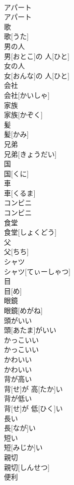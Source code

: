 \documentclass[8pt]{extreport}
\begin{document}
\begin{CJK}{UTF8}{min}
\\	アパート	
\\	アパート
\\	歌	
\\	歌[うた]
\\	男の人	
\\	男[おとこ]の 人[ひと]
\\	女の人	
\\	女[おんな]の 人[ひと]
\\	会社	
\\	会社[かいしゃ]
\\	家族	
\\	家族[かぞく]
\\	髪	
\\	髪[かみ]
\\	兄弟	
\\	兄弟[きょうだい]
\\	国	
\\	国[くに]
\\	車	
\\	車[くるま]
\\	コンビニ	
\\	コンビニ
\\	食堂	
\\	食堂[しょくどう]
\\	父	
\\	父[ちち]
\\	シャツ	
\\	シャツ[てぃーしゃつ]
\\	目	
\\	目[め]
\\	眼鏡	
\\	眼鏡[めがね]
\\	頭がいい	
\\	頭[あたま]がいい
\\	かっこいい	
\\	かっこいい
\\	かわいい	
\\	かわいい
\\	背が高い	
\\	背[せ]が 高[たか]い
\\	背が低い	
\\	背[せ]が 低[ひく]い
\\	長い	
\\	長[なが]い
\\	短い	
\\	短[みじか]い
\\	親切	
\\	親切[しんせつ]
\\	便利	

\end{CJK}
\end{document}
